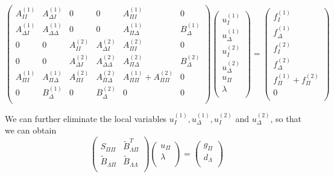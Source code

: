 \begin{equation}
\begin{pmatrix}
A_{II}^{(1)} &  A_{\Delta I}^{(1)}& 0 & 0 & A_{\Pi I}^{(1)} & 0 \\
A_{\Delta I}^{(1)} & A_{\Delta \Delta}^{(1)} & 0 & 0& A_{\Pi \Delta}^{(1)} & B_{\Delta}^{(1)}\\
0 & 0 & A_{II}^{(2)} & A_{\Delta I}^{(2)} & A_{\Pi I}^{(2)} & 0 \\
0 & 0 & A_{\Delta I}^{(2)} & A_{\Delta \Delta}^{(2)} & A_{\Pi \Delta}^{(2)} & B_{\Delta}^{(2)} \\
A_{\Pi I}^{(1)} & A_{\Pi \Delta}^{(1)} & A_{\Pi I}^{(2)} & A_{\Pi \Delta}^{(2)} & A_{\Pi \Pi}^{(1)} + A_{\Pi \Pi}^{(2)} & 0 \\
0 & B_{\Delta}^{(1)} & 0 & B_{\Delta}^{(2)} & 0 & 0 \\
\end{pmatrix} \begin{pmatrix}
u_{I}^{(1)} \\ u_{\Delta}^{(1)} \\ u_{I}^{(2)} \\ u_{\Delta}^{(2)} \\ u_{\Pi} \\ \lambda\\
\end{pmatrix} = \begin{pmatrix}
f_{I}^{(1)} \\ f_{\Delta}^{(1)} \\ f_{I}^{(2)} \\ f_{\Delta}^{(2)} \\ f_{\Pi}^{(1)} + f_{\Pi}^{(2)} \\ 0\\
\end{pmatrix}
\end{equation}

We can further eliminate the local variables $ u_{I}^{(1)}, u_{\Delta}^{(1)}, u_{I}^{(2)} $ and $ u_{\Delta}^{(2)} $, so that we can obtain
\begin{equation}
\begin{pmatrix}
S_{\Pi \Pi} & \tilde{B}_{\Lambda \Pi}^{T} \\ 
\tilde{B}_{\Lambda \Pi} & \tilde{B}_{\Lambda \Lambda} \\
\end{pmatrix} \begin{pmatrix}
u_{\Pi} \\ \lambda \\
\end{pmatrix} = \begin{pmatrix}
g_{\Pi} \\ d_{\Lambda}\\
\end{pmatrix}
\end{equation}

